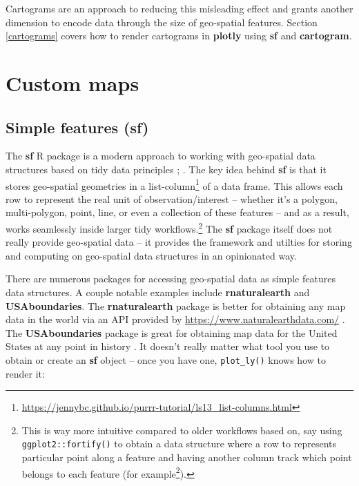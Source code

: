 \documentclass[
  12pt,
]{krantz}
\renewcommand{\href}[2]{#2\footnote{\url{#1}}}
\begin{document}
Cartograms are an approach to reducing this misleading effect and grants another dimension to encode data through the size of geo-spatial features. Section \ref{cartograms} covers how to render cartograms in \textbf{plotly} using \textbf{sf} and \textbf{cartogram}.

\hypertarget{maps-custom}{%
\section{Custom maps}\label{maps-custom}}

\hypertarget{sf}{%
\subsection{Simple features (sf)}\label{sf}}

The \textbf{sf} R package is a modern approach to working with geo-spatial data structures based on tidy data principles \citep{sf}; \citep{tidy-data}. The key idea behind \textbf{sf} is that it stores geo-spatial geometries in a \href{https://jennybc.github.io/purrr-tutorial/ls13_list-columns.html}{list-column} of a data frame. This allows each row to represent the real unit of observation/interest -- whether it's a polygon, multi-polygon, point, line, or even a collection of these features -- and as a result, works seamlessly inside larger tidy workflows.\footnote{This is way more intuitive compared to older workflows based on, say using \texttt{ggplot2::fortify()} to obtain a data structure where a row to represents particular point along a feature and having another column track which point belongs to each feature (\href{https://gis.stackexchange.com/questions/165974/r-fortify-causing-polygons-to-tear}{for example}).} The \textbf{sf} package itself does not really provide geo-spatial data -- it provides the framework and utilties for storing and computing on geo-spatial data structures in an opinionated way.

There are numerous packages for accessing geo-spatial data as simple features data structures. A couple notable examples include \textbf{rnaturalearth} and \textbf{USAboundaries}. The \textbf{rnaturalearth} package is better for obtaining any map data in the world via an API provided by \url{https://www.naturalearthdata.com/} \citep{rnaturalearth}. The \textbf{USAboundaries} package is great for obtaining map data for the United States at any point in history \citep{USAboundaries}. It doesn't really matter what tool you use to obtain or create an \textbf{sf} object -- once you have one, \texttt{plot\_ly()} knows how to render it:
\end{document}
